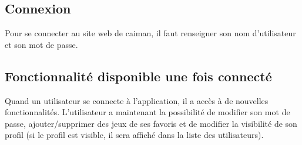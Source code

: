 \documentclass[a4paper,12pt,french]{sphinxmanual}
\begin{document}
\subsection{Connexion}
\label{\detokenize{organique:connexion}}
\sphinxAtStartPar
Pour se connecter au site web de caiman, il faut renseigner son nom d’utilisateur et son mot de passe.

\begin{sphinxVerbatim}[commandchars=\\\{\}]
\end{sphinxVerbatim}


\subsection{Fonctionnalité disponible une fois connecté}
\label{\detokenize{organique:fonctionnalite-disponible-une-fois-connecte}}
\sphinxAtStartPar
Quand un utilisateur se connecte à l’application, il a accès à de nouvelles fonctionnalités. L’utilisateur a maintenant la possibilité de modifier son mot de passe, ajouter/supprimer des jeux de ses favoris et de modifier la visibilité de son profil (si le profil est visible, il sera affiché dans la liste des utilisateurs).
\end{document}
